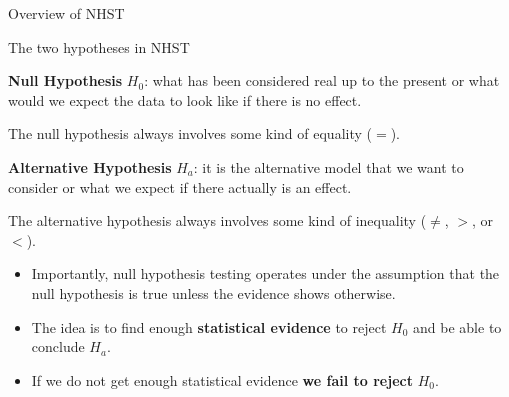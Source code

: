 \documentclass[handout]{beamer}
\begin{document}
\begin{frame}{Overview of NHST}
\scriptsize{
\begin{block}{The two hypotheses in NHST}
 \begin{itemize}
\scriptsize{
\item \textbf{Null Hypothesis} $H_{0}$: what has been considered real up to the present or what would we expect the data to look like if there is no effect.
\begin{itemize}
\scriptsize{
 \item The null hypothesis always involves some kind of equality ($=$).}
\end{itemize}



\item \textbf{Alternative Hypothesis} $H_{a}$: it is the alternative model that we want to consider or  what we expect if there actually is an effect. 
\begin{itemize}
\scriptsize{
 \item The alternative hypothesis always involves some kind of inequality ($\neq$, $>$, or $<$).}
\end{itemize}


}
 \end{itemize}
 
\end{block}


\begin{itemize}
\item Importantly, null hypothesis testing operates under the assumption that the null hypothesis is true unless the evidence shows otherwise.
\item The idea is to find enough \textbf{statistical evidence} to reject $H_{0}$ and be able to conclude $H_{a}$.
\item If we do not get enough statistical evidence \textbf{we fail to reject} $H_{0}$.
\end{itemize}



} 
\end{frame}
\end{document}

